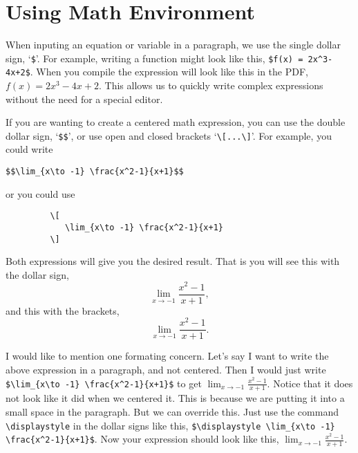\documentclass{amsart}
\begin{document}
\section{Using Math Environment} \label{math} 


   When inputing an equation or variable in a paragraph, we use the single dollar sign, `\verb|$|'. For example, writing a function might look like this, \verb|$f(x) = 2x^3-4x+2$|. When you compile the expression will look like this in the PDF, $f(x) = 2x^3-4x+2$. This allows us to quickly write complex expressions without the need for a special editor.

   If you are wanting to create a centered math expression, you can use the double dollar sign, `\verb|$$|', or use open and closed brackets `\verb|\[...\]|'. For example, you could write
      \begin{center}
         \verb|$$\lim_{x\to -1} \frac{x^2-1}{x+1}$$|
      \end{center}
   or you could use
      \begin{center} 
         \begin{verbatim}
         \[
            \lim_{x\to -1} \frac{x^2-1}{x+1}
         \]         
         \end{verbatim}
      \end{center}
   Both expressions will give you the desired result.  That is you will see this with the dollar sign, 
   $$\lim_{x\to -1} \frac{x^2-1}{x+1},$$
   and this with the brackets,
      \[
          \lim_{x\to -1} \frac{x^2-1}{x+1}.
      \]     


   I would like to mention one formating concern. Let's say I want to write the above expression in a paragraph, and not centered. Then I would just write \verb|$\lim_{x\to -1} \frac{x^2-1}{x+1}$| to get $\lim_{x\to -1} \frac{x^2-1}{x+1}$. Notice that it does not look like it did when we centered it. This is because we are putting it into a small space in the paragraph. But we can override this. Just use the command \verb|\displaystyle| in the dollar signs like this, \verb|$\displaystyle \lim_{x\to -1} \frac{x^2-1}{x+1}$|. Now your expression should look like this, $\displaystyle \lim_{x\to -1} \frac{x^2-1}{x+1}$.
\end{document}
